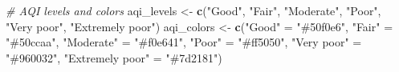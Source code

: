 \documentclass[
]{article}
\newenvironment{Shaded}{\begin{snugshade}}{\end{snugshade}}
\newcommand{\CommentTok}[1]{\textcolor[rgb]{0.56,0.35,0.01}{\textit{#1}}}
\newcommand{\FunctionTok}[1]{\textcolor[rgb]{0.13,0.29,0.53}{\textbf{#1}}}
\newcommand{\NormalTok}[1]{#1}
\newcommand{\OtherTok}[1]{\textcolor[rgb]{0.56,0.35,0.01}{#1}}
\newcommand{\StringTok}[1]{\textcolor[rgb]{0.31,0.60,0.02}{#1}}
\begin{document}
\begin{Shaded}
\begin{Highlighting}[]
\CommentTok{\# AQI levels and colors}
\NormalTok{aqi\_levels }\OtherTok{\textless{}{-}} \FunctionTok{c}\NormalTok{(}\StringTok{"Good"}\NormalTok{, }\StringTok{"Fair"}\NormalTok{, }\StringTok{"Moderate"}\NormalTok{, }\StringTok{"Poor"}\NormalTok{, }\StringTok{"Very poor"}\NormalTok{, }\StringTok{"Extremely poor"}\NormalTok{)}
\NormalTok{aqi\_colors }\OtherTok{\textless{}{-}} \FunctionTok{c}\NormalTok{(}\StringTok{"Good"}           \OtherTok{=} \StringTok{"\#50f0e6"}\NormalTok{,}
                \StringTok{"Fair"}           \OtherTok{=} \StringTok{"\#50ccaa"}\NormalTok{,}
                \StringTok{"Moderate"}       \OtherTok{=} \StringTok{"\#f0e641"}\NormalTok{,}
                \StringTok{"Poor"}           \OtherTok{=} \StringTok{"\#ff5050"}\NormalTok{,}
                \StringTok{"Very poor"}      \OtherTok{=} \StringTok{"\#960032"}\NormalTok{,}
                \StringTok{"Extremely poor"} \OtherTok{=} \StringTok{"\#7d2181"}\NormalTok{)}


\end{Highlighting}
\end{Shaded}
\end{document}
